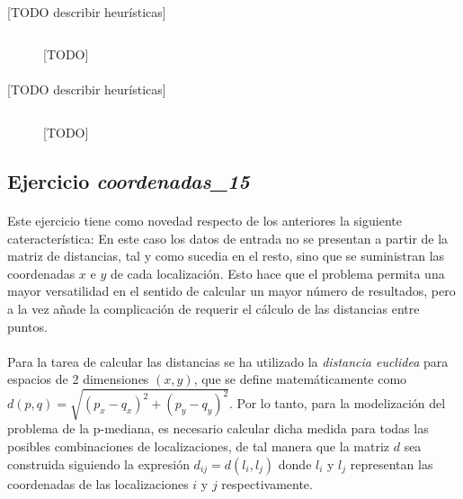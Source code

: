 \documentclass[spanish]{article}
\begin{document}
		\paragraph{}
		[TODO describir heurísticas]

		\begin{figure}[h]
			\centering
			\inputminted{basic}{./code/p-median-greedy.mos}
			\caption{[TODO]}
			\label{}
		\end{figure}

		\paragraph{}
		[TODO describir heurísticas]

		\begin{figure}[h]
			\centering
			\inputminted{basic}{./code/local-search-p-median-greedy.mos}
			\caption{[TODO]}
			\label{}
		\end{figure}

		\subsection{Ejercicio \emph{coordenadas\_15}}
		\label{sec:e-8a}

			\paragraph{}
			Este ejercicio tiene como novedad respecto de los anteriores la siguiente cateracterística: En este caso los datos de entrada no se presentan a partir de la matriz de distancias, tal y como sucedia en el resto, sino que se suministran las coordenadas $x$ e $y$ de cada localización. Esto hace que el problema permita una mayor versatilidad en el sentido de calcular un mayor número de resultados, pero a la vez añade la complicación de requerir el cálculo de las distancias entre puntos.

			\paragraph{}
			Para la tarea de calcular las distancias se ha utilizado la \emph{distancia euclidea} para espacios de 2 dimensiones $(x,y)$, que se define matemáticamente como $d(p, q) = \sqrt{(p_x - q_x)^2 + (p_y - q_y)^2}$. Por lo tanto, para la modelización del problema de la p-mediana, es necesario calcular dicha medida para todas las posibles combinaciones de localizaciones, de tal manera que la matriz $d$ sea construida siguiendo la expresión $d_{ij} = d(l_i, l_j)$ donde $l_i$ y $l_j$ representan las coordenadas de las localizaciones $i$ y $j$ respectivamente.
\end{document}

